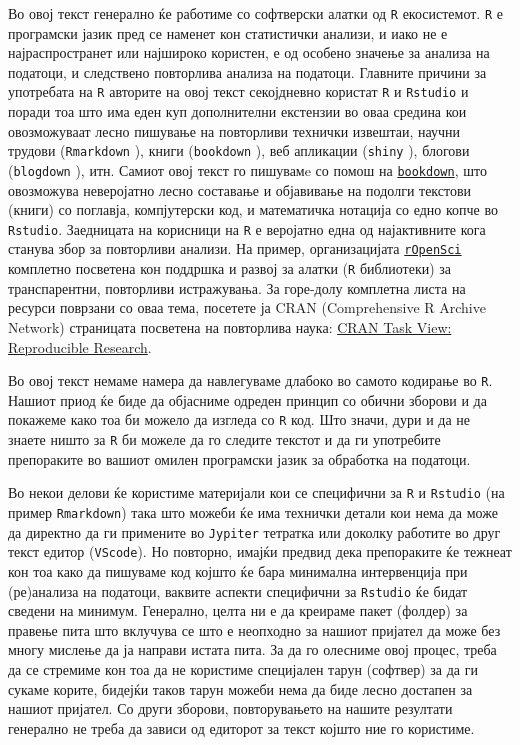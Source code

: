 \documentclass[
]{book}
\begin{document}
Во овој текст генерално ќе работиме со софтверски алатки од \texttt{R} екосистемот. \texttt{R} е програмски јазик пред се наменет кон статистички анализи, и иако не е најраспространет или најшироко користен, е од особено значење за анализа на податоци, и следствено повторлива анализа на податоци. Главните причини за употребата на \texttt{R} авторите на овој текст секојдневно користат \texttt{R} и \texttt{Rstudio} и поради тоа што има еден куп дополнителни екстензии во оваа средина кои овозможуваат лесно пишување на повторливи технички извештаи, научни трудови (\texttt{Rmarkdown} \citep{R-rmarkdown}), книги (\texttt{bookdown} \citep{R-bookdown}), веб апликации (\texttt{shiny} \citep{R-shiny}), блогови (\texttt{blogdown} \citep{R-blogdown}), итн. Самиот овој текст го пишувамe со помош на \href{https://bookdown.org/}{\texttt{bookdown}}, што овозможува неверојатно лесно составање и објавивање на подолги текстови (книги) со поглавја, компјутерски код, и математичка нотација со едно копче во \texttt{Rstudio}. Заедницата на корисници на \texttt{R} е веројатно една од најактивните кога станува збор за повторливи анализи. На пример, организацијата \href{https://ropensci.org/}{\texttt{rOpenSci}} комплетно посветена кон поддршка и развој за алатки (\texttt{R} библиотеки) за транспарентни, повторливи истражувања. За горе-долу комплетна листа на ресурси поврзани со оваа тема, посетете ја CRAN (Comprehensive R Archive Network) страницата посветена на повторлива наука: \href{https://cran.r-project.org/web/views/ReproducibleResearch.html}{CRAN Task View: Reproducible Research}.

Во овој текст немаме намера да навлегуваме длабоко во самото кодирање во \texttt{R}. Нашиот приод ќе биде да објасниме одреден принцип со обични зборови и да покажеме како тоа би можело да изгледа со \texttt{R} код. Што значи, дури и да не знаете ништо за \texttt{R} би можеле да го следите текстот и да ги употребите препораките во вашиот омилен програмски јазик за обработка на податоци.

Во некои делови ќе користиме материјали кои се специфични за \texttt{R} и \texttt{Rstudio} (на пример \texttt{Rmarkdown}) така што можеби ќе има технички детали кои нема да може да директно да ги примените во \texttt{Jypiter} тетратка или доколку работите во друг текст едитор (\texttt{VScode}). Но повторно, имајќи предвид дека препораките ќе тежнеат кон тоа како да пишуваме код којшто ќе бара минимална интервенција при (ре)анализа на податоци, ваквите аспекти специфични за \texttt{Rstudio} ќе бидат сведени на минимум. Генерално, целта ни е да креираме пакет (фолдер) за правење пита што вклучува се што е неопходно за нашиот пријател да може без многу мислење да ја направи истата пита. За да го олесниме овој процес, треба да се стремиме кон тоа да не користиме специјален тарун (софтвер) за да ги сукаме корите, бидејќи таков тарун можеби нема да биде лесно достапен за нашиот пријател. Со други зборови, повторувањето на нашите резултати генерално не треба да зависи од едиторот за текст којшто ние го користиме.
\end{document}
